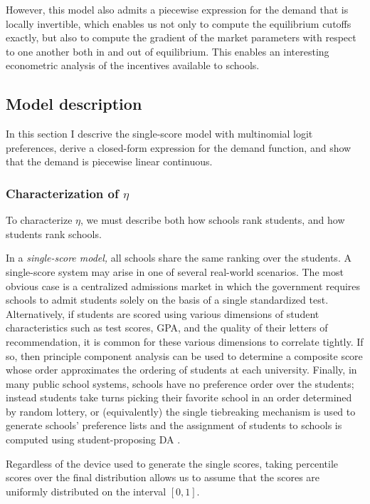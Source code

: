 \documentclass[12pt]{article}
\theoremstyle{definition}
\begin{document}
However, this model also admits a piecewise expression for the demand that is locally invertible, which enables us not only to compute the equilibrium cutoffs exactly, but also to compute the gradient of the market parameters with respect to one another both in and out of equilibrium. This enables an interesting econometric analysis of the incentives available to schools.

\subsection{Model description} 

In this section I descrive the single-score model with multinomial logit preferences, derive a closed-form expression for the demand function, and show that the demand is piecewise linear continuous. %

\subsubsection{Characterization of $\eta$}

To characterize $\eta$, we must describe both how schools rank students, and how students rank schools.

In a \emph{single-score model,} all schools share the same ranking over the students. A single-score system may arise in one of several real-world scenarios. The most obvious case is a centralized admissions market in which the government requires schools to admit students solely on the basis of a single standardized test. Alternatively, if students are scored using various dimensions of student characteristics such as test scores, GPA, and the quality of their letters of recommendation, it is common for these various dimensions to correlate tightly. If so, then principle component analysis can be used to determine a composite score whose order approximates the ordering of students at each university. Finally, in many public school systems, schools have no preference order over the students; instead students take turns picking their favorite school in an order determined by random lottery, or (equivalently) the single tiebreaking mechanism is used to generate schools’ preference lists and the assignment of students to schools is computed using student-proposing DA \parencite[][]{whatmatters}. 

Regardless of the device used to generate the single scores, taking percentile scores over the final distribution allows us to assume that the scores are uniformly distributed on the interval $[0,1]$. 
\end{document}
